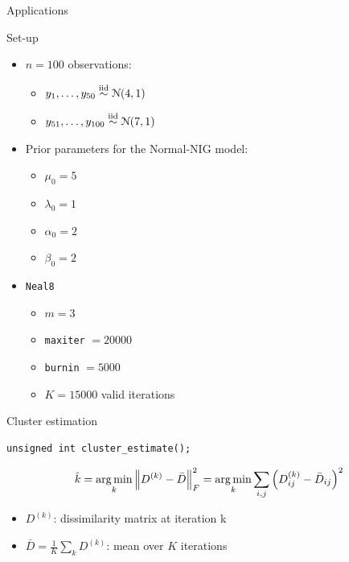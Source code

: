 \begin{frame}[c]
	\begin{center}
		\huge \color{blue} Applications
	\end{center}
\end{frame}

\begin{frame}[fragile]{Set-up}
\begin{itemize}
\item $n=100$ observations:
	\begin{itemize}
	\item $y_1,\dots, y_{50} \stackrel{\text{iid}}{\sim} \mathcal N(4,1)$
	\item $y_{51}, \dots, y_{100} \stackrel{\text{iid}}{\sim} \mathcal N(7,1)$
	\end{itemize}
\item Prior parameters for the Normal-NIG model:
	\begin{itemize}
	\item $\mu_0 = 5$ 
	\item $\lambda_0 = 1$
	\item $\alpha_0 = 2$
	\item $\beta_0 = 2$
	\end{itemize}

\item \verb|Neal8|
	\begin{itemize}
	\item $m=3$ 
	\item \verb|maxiter| $=20000$
	\item \verb|burnin| $=5000$
	\item $K=15000$ valid iterations
	\end{itemize}
\end{itemize}
\end{frame}

\begin{frame}[fragile]{Cluster estimation}


\begin{verbatim}
unsigned int cluster_estimate();
\end{verbatim}

$$ \hat{k} = \operatorname*{arg\,min}_k \left \lVert D^{(k)} - \bar D \right\rVert_F^2= \operatorname*{arg\,min}_k \sum_{i,j} \left( D^{(k)}_{ij} - \bar{D}_{ij}  \right)^2$$


\begin{itemize}

\item $D^{(k)}$: dissimilarity matrix  at iteration k \\

\item $\bar D= \frac{1}{K} \sum_k D^{(k)} $: mean over $K$ iterations
\end{itemize}

\end{frame}

